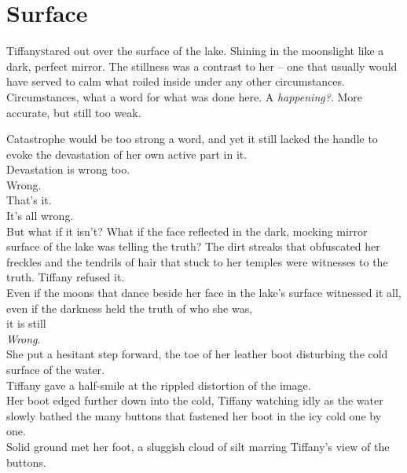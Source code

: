 \chapter{Surface}

\lettrine{Tiffany} stared out over the surface of the lake. 
Shining in the moonslight like a dark, perfect mirror. 
The stillness was a contrast to her -- one that usually would have served to calm what roiled inside under any other circumstances.\\

Circumstances, what a word for what was done here. 
A \textit{happening?}. 
More accurate, but still too weak.

Catastrophe would be too strong a word, and yet it still lacked the handle to evoke the devastation of her own active part in it.\\

Devastation is wrong too.\\

Wrong.\\

That's it.\\

It's all wrong.\\

But what if it isn't?
What if the face reflected in the dark, mocking mirror surface of the lake was telling the truth?
The dirt streaks that obfuscated her freckles and the tendrils of hair that stuck to her temples were witnesses to the truth.
Tiffany refused it.\\

Even if the moons that dance beside her face in the lake's surface witnessed it all, even if the darkness held the truth of who she was,\\

it is still\\

\textit{Wrong}.\\

She put a hesitant step forward, the toe of her leather boot disturbing the cold surface of the water.\\
Tiffany gave a half-smile at the rippled distortion of the image.\\
Her boot edged further down into the cold, Tiffany watching idly as the water slowly bathed the many buttons that fastened her boot in the icy cold one by one.\\

Solid ground met her foot, a sluggish cloud of silt marring Tiffany's view of the buttons.\\

